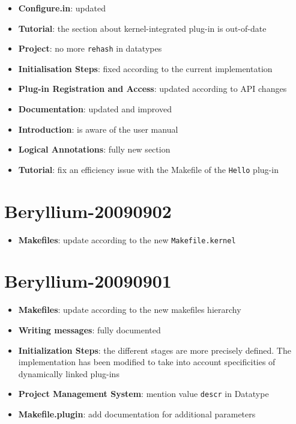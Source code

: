 \begin{itemize}
\item \textbf{Configure.in}: updated
\item \textbf{Tutorial}: the section about kernel-integrated plug-in is
  out-of-date
\item \textbf{Project}: no more \texttt{rehash} in datatypes
\item \textbf{Initialisation Steps}: fixed according to the current
  implementation
\item \textbf{Plug-in Registration and Access}: updated according to API
  changes
\item \textbf{Documentation}: updated and improved
\item \textbf{Introduction}: is aware of the \framac user manual
\item \textbf{Logical Annotations}: fully new section
\item \textbf{Tutorial}: fix an efficiency issue with the Makefile of the
  \texttt{Hello} plug-in
\end{itemize}

\section*{Beryllium-20090902}

\begin{itemize}
\item \textbf{Makefiles}: update according to the new \texttt{Makefile.kernel}
\end{itemize}

\section*{Beryllium-20090901}

\begin{itemize}
\item \textbf{Makefiles}: update according to the new makefiles hierarchy
\item \textbf{Writing messages}: fully documented
\item \textbf{Initialization Steps}: the different stages are more
  precisely defined. The implementation has been modified to take into
  account specificities of dynamically linked plug-ins
\item \textbf{Project Management System}: mention value \texttt{descr} in
  Datatype
\item \textbf{Makefile.plugin}: add documentation for additional parameters
\end{itemize}


